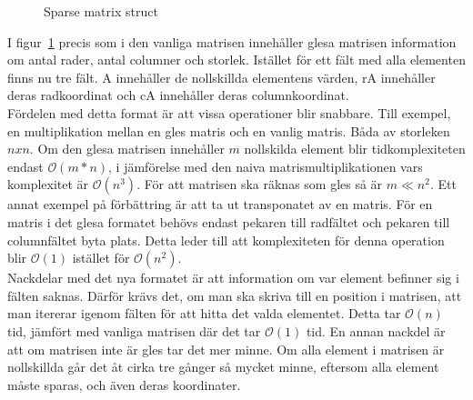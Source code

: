 \begin{figure}[H]

\caption{Sparse matrix struct}
\label{fig:sparse_struct}
\end{figure}

I figur~\ref{fig:sparse_struct} precis som i den vanliga matrisen innehåller glesa matrisen information om antal rader, antal columner och storlek. Istället för ett fält med alla elementen finns nu tre fält. A innehåller de nollskillda elementens värden, rA innehåller deras radkoordinat och cA innehåller deras columnkoordinat. \\
Fördelen med detta format är att vissa operationer blir snabbare. Till exempel, en multiplikation mellan en gles matris och en vanlig matris. Båda av storleken $nxn$. Om den glesa matrisen innehåller $m$ nollskilda element blir tidkomplexiteten endast $\mathcal{O}(m*n)$, i jämförelse med den naiva matrismultiplikationen vars komplexitet är $\mathcal{O}(n^3)$. För att matrisen ska räknas som gles så är $m \ll n^2$.
Ett annat exempel på förbättring är att ta ut transponatet av en matris. För en matris i det glesa formatet behövs endast pekaren till radfältet och pekaren till columnfältet byta plats. Detta leder till att komplexiteten för denna operation blir $\mathcal{O}(1)$ istället för $\mathcal{O}(n^2)$. \\
Nackdelar med det nya formatet är att information om var element befinner sig i fälten saknas. Därför krävs det, om man ska skriva till en position i matrisen, att man itererar igenom fälten för att hitta det valda elementet. Detta tar $\mathcal{O}(n)$ tid, jämfört med vanliga matrisen där det tar $\mathcal{O}(1)$ tid.
En annan nackdel är att om matrisen inte är gles tar det mer minne. Om alla element i matrisen är nollskillda går det åt cirka tre gånger så mycket minne, eftersom alla element måste sparas, och även deras koordinater.

